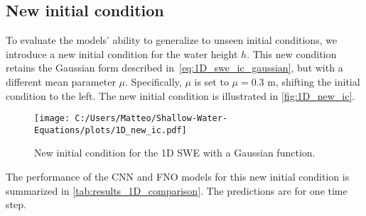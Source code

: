 \subsection*{New initial condition}
To evaluate the models' ability to generalize to unseen initial conditions, we introduce a new initial condition for the water height $h$.
This new condition retains the Gaussian form described in~\eqref{eq:1D_swe_ic_gaussian}, but with a different mean parameter $\mu$.
Specifically, $\mu$ is set to $\mu = 0.3$ m, shifting the initial condition to the left.
The new initial condition is illustrated in \autoref{fig:1D_new_ic}.
\begin{figure}[H]
    \centering
    \texttt{[image: C:/Users/Matteo/Shallow-Water-Equations/plots/1D\_new\_ic.pdf]}
    \caption{New initial condition for the 1D SWE with a Gaussian function.}\label{fig:1D_new_ic}
\end{figure}
The performance of the CNN and FNO models for this new initial condition is summarized in \autoref{tab:results_1D_comparison}.
The predictions are for one time step.

